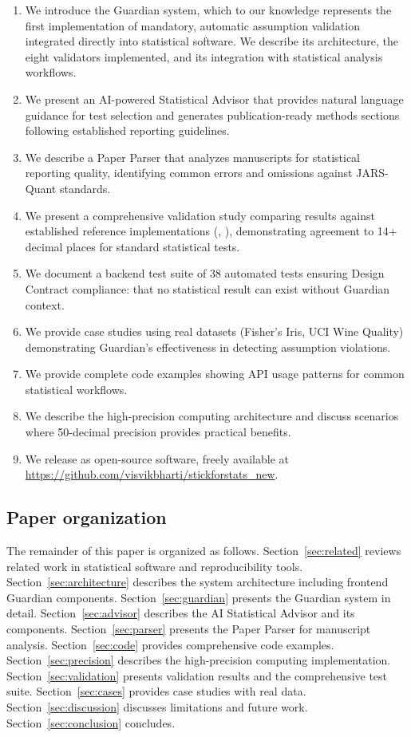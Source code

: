 \documentclass[article]{jss}
\begin{document}
\begin{enumerate}
\item We introduce the Guardian system, which to our knowledge represents the first implementation of mandatory, automatic assumption validation integrated directly into statistical software. We describe its architecture, the eight validators implemented, and its integration with statistical analysis workflows.
\item We present an AI-powered Statistical Advisor that provides natural language guidance for test selection and generates publication-ready methods sections following established reporting guidelines.
\item We describe a Paper Parser that analyzes manuscripts for statistical reporting quality, identifying common errors and omissions against JARS-Quant standards.
\item We present a comprehensive validation study comparing  results against established reference implementations (, ), demonstrating agreement to 14+ decimal places for standard statistical tests.
\item We document a backend test suite of 38 automated tests ensuring Design Contract compliance: that no statistical result can exist without Guardian context.
\item We provide case studies using real datasets (Fisher's Iris, UCI Wine Quality) demonstrating Guardian's effectiveness in detecting assumption violations.
\item We provide complete code examples showing API usage patterns for common statistical workflows.
\item We describe the high-precision computing architecture and discuss scenarios where 50-decimal precision provides practical benefits.
\item We release  as open-source software, freely available at \url{https://github.com/visvikbharti/stickforstats_new}.
\end{enumerate}

\subsection{Paper organization}

The remainder of this paper is organized as follows. Section~\ref{sec:related} reviews related work in statistical software and reproducibility tools. Section~\ref{sec:architecture} describes the system architecture including frontend Guardian components. Section~\ref{sec:guardian} presents the Guardian system in detail. Section~\ref{sec:advisor} describes the AI Statistical Advisor and its components. Section~\ref{sec:parser} presents the Paper Parser for manuscript analysis. Section~\ref{sec:code} provides comprehensive code examples. Section~\ref{sec:precision} describes the high-precision computing implementation. Section~\ref{sec:validation} presents validation results and the comprehensive test suite. Section~\ref{sec:cases} provides case studies with real data. Section~\ref{sec:discussion} discusses limitations and future work. Section~\ref{sec:conclusion} concludes.
\end{document}
